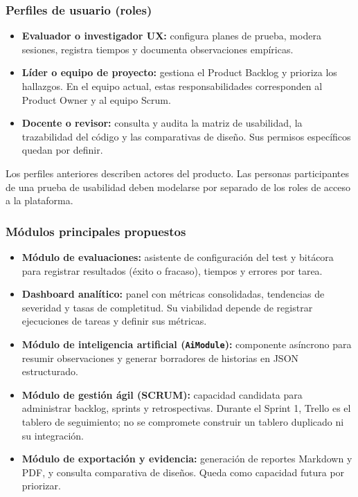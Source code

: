 \documentclass[12pt,a4paper]{article}
\begin{document}
\subsubsection{Perfiles de usuario (roles)}

\begin{itemize}
    \item \textbf{Evaluador o investigador UX:} configura planes de prueba, modera sesiones, registra tiempos y documenta observaciones empíricas.
    \item \textbf{Líder o equipo de proyecto:} gestiona el Product Backlog y prioriza los hallazgos. En el equipo actual, estas responsabilidades corresponden al Product Owner y al equipo Scrum.
    \item \textbf{Docente o revisor:} consulta y audita la matriz de usabilidad, la trazabilidad del código y las comparativas de diseño. Sus permisos específicos quedan por definir.
\end{itemize}

Los perfiles anteriores describen actores del producto. Las personas participantes
de una prueba de usabilidad deben modelarse por separado de los roles de acceso a la
plataforma.

\subsubsection{Módulos principales propuestos}

\begin{itemize}
    \item \textbf{Módulo de evaluaciones:} asistente de configuración del test y bitácora para registrar resultados (éxito o fracaso), tiempos y errores por tarea.
    \item \textbf{Dashboard analítico:} panel con métricas consolidadas, tendencias de severidad y tasas de completitud. Su viabilidad depende de registrar ejecuciones de tareas y definir sus métricas.
    \item \textbf{Módulo de inteligencia artificial (\texttt{AiModule}):} componente asíncrono para resumir observaciones y generar borradores de historias en JSON estructurado.
    \item \textbf{Módulo de gestión ágil (SCRUM):} capacidad candidata para administrar backlog, sprints y retrospectivas. Durante el Sprint 1, Trello es el tablero de seguimiento; no se compromete construir un tablero duplicado ni su integración.
    \item \textbf{Módulo de exportación y evidencia:} generación de reportes Markdown y PDF, y consulta comparativa de diseños. Queda como capacidad futura por priorizar.
\end{itemize}
\end{document}
